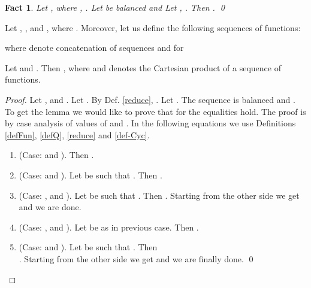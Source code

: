\documentclass{llncs}
\newtheorem{fact}[theorem]{Fact}
\begin{document}
\begin{fact}
Let , where , . Let  be
balanced and  Let ,
. Then . \qed
\end{fact}

\begin{definition}\label{def-Cyc}
Let , ,  and , where . Moreover, let us define the following sequences of
functions:

where  denote concatenation of sequences and for  
\end{definition}

\begin{lemma}\label{l5}
Let  and . Then , where
 and  denotes the Cartesian product of a sequence of
functions.
\end{lemma}
\begin{proof}
Let ,  and . Let . By 
Def. \ref{reduce}, . Let . The sequence  is balanced and 
. To get the lemma we would like to prove that for 
 the equalities  hold. The proof is by case analysis 
of 
values of  and . In the following equations we use Definitions 
\ref{defFun}, \ref{defQ}, \ref{reduce} and \ref{def-Cyc}.
\begin{enumerate}
\item (Case:  and ). Then .
\item (Case:  and ). Let  be such that . Then .
\item (Case: ,  and ). Let  be such 
that . Then . Starting from the other side we get
 and we are done.
\item (Case: ,  and ). Let  be as in 
previous case. Then .
\item (Case:  and ). Let  be such 
that . Then  \\ . Starting from the other side we get
 and we are finally done. \qed
\end{enumerate}
\end{proof}
\end{document}
